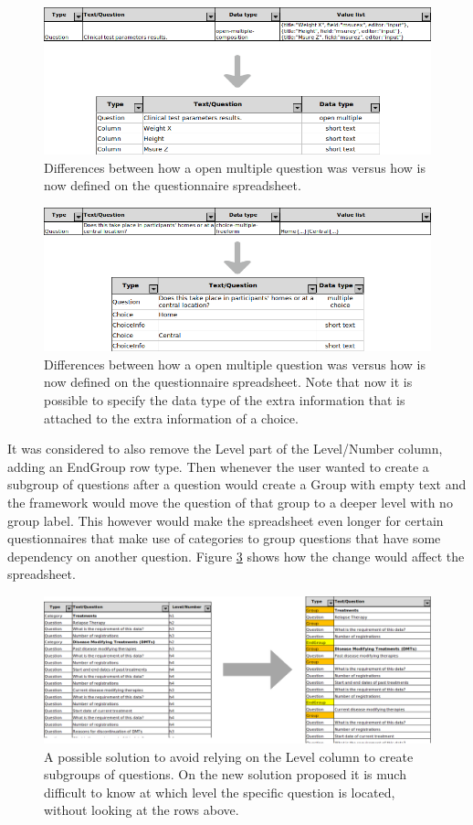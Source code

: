 \begin{figure}
    \center
    \includegraphics[width=.75\textwidth]{open-multiple-neu}
    \caption{Differences between how a open multiple question was versus how is now defined on the questionnaire spreadsheet.}
    \label{fig:open-multiple-neu}
\end{figure}

\begin{figure}
    \center
    \includegraphics[width=.75\textwidth]{choice-neu}
    \caption{Differences between how a open multiple question was versus how is now defined on the questionnaire spreadsheet.
    Note that now it is possible to specify the data type of the extra information that is attached to the extra information of a choice.}
    \label{fig:choice-neu}
\end{figure}

It was considered to also remove the Level part of the Level/Number column, adding an EndGroup row type.
Then whenever the user wanted to create a subgroup of questions after a question would create a Group with empty text and the framework would move the question of that group to a deeper level with no group label.
This however would make the spreadsheet even longer for certain questionnaires that make use of categories to group questions that have some dependency on another question.
Figure \ref{fig:excel-end-group} shows how the change would affect the spreadsheet.

\begin{figure}[h]
    \center
    \includegraphics[width=\textwidth]{excel-end-group}
    \caption{A possible solution to avoid relying on the Level column to create subgroups of questions. On the new solution proposed it is much difficult to know at which level the specific question is located, without looking at the rows above.}
    \label{fig:excel-end-group}
\end{figure}


